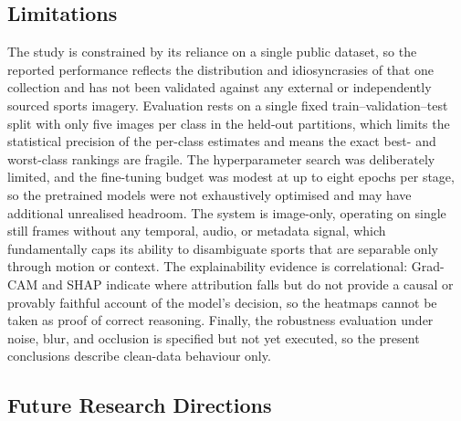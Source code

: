\subsection{Limitations}
\label{subsec:disc-limitations}

The study is constrained by its reliance on a single public dataset, so the reported performance reflects the distribution and idiosyncrasies of that one collection and has not been validated against any external or independently sourced sports imagery.
Evaluation rests on a single fixed train--validation--test split with only five images per class in the held-out partitions, which limits the statistical precision of the per-class estimates and means the exact best- and worst-class rankings are fragile.
The hyperparameter search was deliberately limited, and the fine-tuning budget was modest at up to eight epochs per stage, so the pretrained models were not exhaustively optimised and may have additional unrealised headroom.
The system is image-only, operating on single still frames without any temporal, audio, or metadata signal, which fundamentally caps its ability to disambiguate sports that are separable only through motion or context.
The explainability evidence is correlational: Grad-CAM and SHAP indicate where attribution falls but do not provide a causal or provably faithful account of the model's decision, so the heatmaps cannot be taken as proof of correct reasoning.
Finally, the robustness evaluation under noise, blur, and occlusion is specified but not yet executed, so the present conclusions describe clean-data behaviour only.

\subsection{Future Research Directions}
\label{subsec:disc-future}

